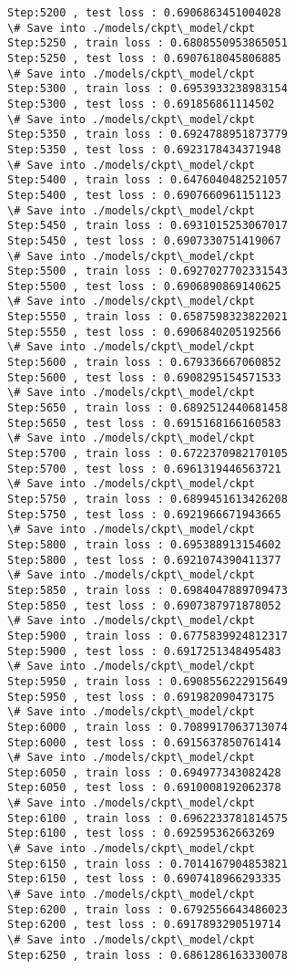 \documentclass[11pt]{article}
\begin{document}
\begin{Verbatim}[commandchars=\\\{\}]
Step:5200 , test loss : 0.6906863451004028
\# Save into ./models/ckpt\_model/ckpt
Step:5250 , train loss : 0.6808550953865051
Step:5250 , test loss : 0.6907618045806885
\# Save into ./models/ckpt\_model/ckpt
Step:5300 , train loss : 0.6953933238983154
Step:5300 , test loss : 0.691856861114502
\# Save into ./models/ckpt\_model/ckpt
Step:5350 , train loss : 0.6924788951873779
Step:5350 , test loss : 0.6923178434371948
\# Save into ./models/ckpt\_model/ckpt
Step:5400 , train loss : 0.6476040482521057
Step:5400 , test loss : 0.6907660961151123
\# Save into ./models/ckpt\_model/ckpt
Step:5450 , train loss : 0.6931015253067017
Step:5450 , test loss : 0.6907330751419067
\# Save into ./models/ckpt\_model/ckpt
Step:5500 , train loss : 0.6927027702331543
Step:5500 , test loss : 0.6906890869140625
\# Save into ./models/ckpt\_model/ckpt
Step:5550 , train loss : 0.6587598323822021
Step:5550 , test loss : 0.6906840205192566
\# Save into ./models/ckpt\_model/ckpt
Step:5600 , train loss : 0.679336667060852
Step:5600 , test loss : 0.6908295154571533
\# Save into ./models/ckpt\_model/ckpt
Step:5650 , train loss : 0.6892512440681458
Step:5650 , test loss : 0.6915168166160583
\# Save into ./models/ckpt\_model/ckpt
Step:5700 , train loss : 0.6722370982170105
Step:5700 , test loss : 0.6961319446563721
\# Save into ./models/ckpt\_model/ckpt
Step:5750 , train loss : 0.6899451613426208
Step:5750 , test loss : 0.6921966671943665
\# Save into ./models/ckpt\_model/ckpt
Step:5800 , train loss : 0.695388913154602
Step:5800 , test loss : 0.6921074390411377
\# Save into ./models/ckpt\_model/ckpt
Step:5850 , train loss : 0.6984047889709473
Step:5850 , test loss : 0.6907387971878052
\# Save into ./models/ckpt\_model/ckpt
Step:5900 , train loss : 0.6775839924812317
Step:5900 , test loss : 0.6917251348495483
\# Save into ./models/ckpt\_model/ckpt
Step:5950 , train loss : 0.6908556222915649
Step:5950 , test loss : 0.691982090473175
\# Save into ./models/ckpt\_model/ckpt
Step:6000 , train loss : 0.7089917063713074
Step:6000 , test loss : 0.6915637850761414
\# Save into ./models/ckpt\_model/ckpt
Step:6050 , train loss : 0.694977343082428
Step:6050 , test loss : 0.6910008192062378
\# Save into ./models/ckpt\_model/ckpt
Step:6100 , train loss : 0.6962233781814575
Step:6100 , test loss : 0.692595362663269
\# Save into ./models/ckpt\_model/ckpt
Step:6150 , train loss : 0.7014167904853821
Step:6150 , test loss : 0.6907418966293335
\# Save into ./models/ckpt\_model/ckpt
Step:6200 , train loss : 0.6792556643486023
Step:6200 , test loss : 0.6917893290519714
\# Save into ./models/ckpt\_model/ckpt
Step:6250 , train loss : 0.6861286163330078

\end{Verbatim}
\end{document}
